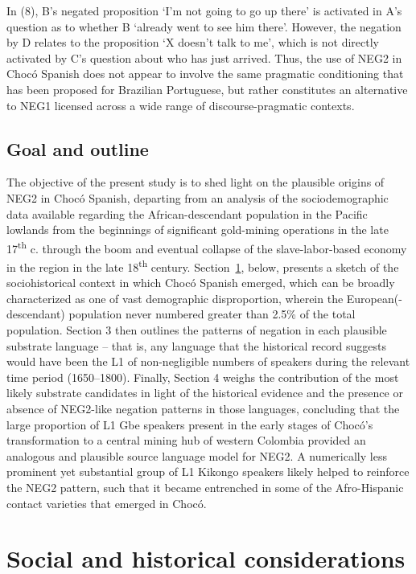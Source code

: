 \documentclass[output=paper,colorlinks,citecolor=brown]{langscibook}
\begin{document}
In (8), B’s negated proposition ‘I’m not going to go up there’ is activated in A’s question as to whether B ‘already went to see him there’. However, the negation by D relates to the proposition ‘X doesn’t talk to me’, which is not directly activated by C’s question about who has just arrived. Thus, the use of NEG2 in Chocó Spanish does not appear to involve the same pragmatic conditioning that has been proposed for Brazilian Portuguese, but rather constitutes an alternative to NEG1 licensed across a wide range of discourse-pragmatic contexts.

\subsection{Goal and outline}

The objective of the present study is to shed light on the plausible origins of NEG2 in Chocó Spanish, departing from an analysis of the sociodemographic data available regarding the African-descendant population in the Pacific lowlands from the beginnings of significant gold-mining operations in the late 17\textsuperscript{th} c. through the boom and eventual collapse of the slave-labor-based economy in the region in the late 18\textsuperscript{th} century. Section~\ref{sec:5:2}, below, presents a sketch of the sociohistorical context in which Chocó Spanish emerged, which can be broadly characterized as one of vast demographic disproportion, wherein the European(-descendant) population never numbered greater than 2.5\% of the total population. Section 3 then outlines the patterns of negation in each plausible substrate language – that is, any language that the historical record suggests would have been the L1 of non-negligible numbers of speakers during the relevant time period (1650--1800). Finally, Section 4 weighs the contribution of the most likely substrate candidates in light of the historical evidence and the presence or absence of NEG2-like negation patterns in those languages, concluding that the large proportion of L1 Gbe speakers present in the early stages of Chocó’s transformation to a central mining hub of western Colombia provided an analogous and plausible source language model for NEG2. A numerically less prominent yet substantial group of L1 Kikongo speakers likely helped to reinforce the NEG2 pattern, such that it became entrenched in some of the Afro-Hispanic contact varieties that emerged in Chocó. 


\section{Social and historical considerations}\label{sec:5:2}
\end{document}

